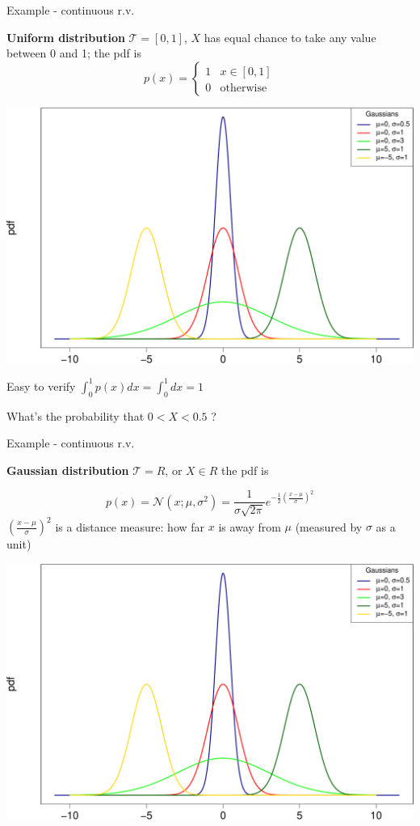 \documentclass{scrartcl}
\newcommand{\normal}[2]{\ensuremath{\mathcal{N}\left (#1,#2 \right )}}
\begin{document}
\begin{frame}{Example - continuous r.v.}
\protect\hypertarget{example---continuous-r.v.}{}

\textbf{Uniform distribution} \(\mathcal{T} = [0,1]\), \(X\) has equal
chance to take any value between 0 and 1; the pdf is
\[p(x) = \begin{cases} 1 & x\in [0,1] \\
0 & \text{otherwise} \end{cases} \]

\begin{center}\includegraphics[width=0.5\linewidth]{math4ml_files/figure-beamer/unnamed-chunk-15-1} \end{center}

Easy to verify \(\int_0^1 p(x)dx = \int_0^1 dx =1\) \bigskip

What's the probability that \(0<X<0.5\) ?

\end{frame}

\begin{frame}{Example - continuous r.v.}
\protect\hypertarget{example---continuous-r.v.-1}{}

\textbf{Gaussian distribution} \(\mathcal{T} = R\), or \(X \in R\) the
pdf is

\[p(x) = \normal{x; \mu}{\sigma^2}=\frac{1}{\sigma \sqrt{2\pi}} e^{-\frac{1}{2}(\frac{x-\mu}{\sigma})^2}\]
\((\frac{x-\mu}{\sigma})^2\) is a distance measure: how far \(x\) is
away from \(\mu\) (measured by \(\sigma\) as a unit)

\begin{center}\includegraphics[width=0.65\linewidth]{math4ml_files/figure-beamer/unnamed-chunk-16-1} \end{center}

\end{frame}
\end{document}
